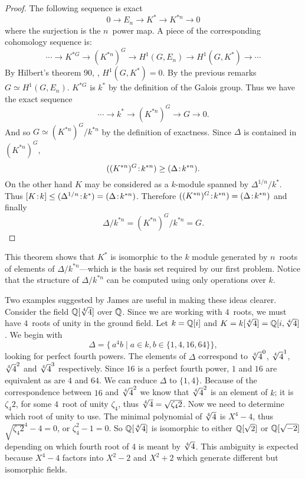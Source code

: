 \begin{proof}
The following sequence is exact
\[
0 \longrightarrow E_n \longrightarrow K^{\ast} \longrightarrow K^{\ast
n} \longrightarrow 0
\]
where the surjection is the $n$\th\ power map.  A piece of the corresponding
cohomology sequence is:
\[
 \cdots \longrightarrow K^{\ast G} \longrightarrow (K^{\ast n})^G
\longrightarrow H^1(G, E_n) \longrightarrow H^1(G, K^{\ast})
\longrightarrow \cdots
\]
By Hilbert's theorem 90, , $H^1(G,
K^{\ast}) = 0$. By the 
previous remarks $G \simeq H^1(G, E_n)$.  $K^{\ast G}$ is $k^{\ast}$ by
the definition of the Galois group.  Thus we have the exact sequence
\[
\cdots \longrightarrow k^{\ast} \longrightarrow (K^{\ast n})^G \longrightarrow G
\longrightarrow 0.
\]
And so $G \simeq (K^{\ast n})^{G}/k^{\ast n}$ by the definition of exactness.
Since $\Delta$ is contained in $(K^{\ast n})^G$,
\[
((K^{\ast n})^G\!:\!k^{\ast n}) \ge (\Delta\!:\!k^{\ast n}).
\]
On the other hand
$K$ may be considered as a $k$-module spanned by $\Delta^{1/n}/k^{\ast}$.
Thus $[K\!:\!k] \le (\Delta^{1/n}\!:\!k^{\ast})
 = (\Delta\!:\!k^{\ast n})$.
Therefore $((K^{\ast n})^G\!:\!k^{\ast n}) 
= (\Delta\!:\!k^{\ast n})$
and finally 
\[
\Delta/ k^{\ast n} = (K^{\ast n})^G / k^{\ast n} = G.
\]
\end{proof}

This theorem shows that $K^\ast$ is isomorphic to the $k$ module
generated by $n$\th\ roots of elements of $\Delta/k^{\ast n}$---which is
the basis set required by our first problem.  Notice that the structure of
$\Delta/k^{\ast n}$ can be computed using only operations over $k$.

Two examples suggested by James {\DavenportJ} are useful in making
these ideas clearer.  Consider the field $\Q[\root4\of{4}]$ over $\mathbb{Q}$.
Since we are working with $4$\th\ roots, we must have $4$\th\ roots of
unity in the ground field.  Let $k = \mathbb{Q}[i]$ and $K = k[\root4\of4] =
\Q[i, \root4\of4]$.  We begin with 
\[
\Delta = \{\,a^4 b \mid a \in k, b \in \{1, 4, 16, 64\}\},
\]
looking for perfect fourth powers.  The elements of $\Delta$ correspond
to ${\root4\of4}^0$, ${\root4\of4}^1$, ${\root4\of4}^2$ and
${\root4\of4}^3$ respectively.  Since $16$ is a perfect fourth power,
$1$ and $16$ are equivalent as are $4$ and $64$.  We can reduce $\Delta$
to $\{1, 4\}$.  Because of the correspondence between $16$ and 
${\root4\of4}^2$ we know that ${\root4\of4}^2$ is an element of $k$;
it is $\zeta_4 2$, for some $4$\th\ root of unity $\zeta_4$, thus
$\root4\of4 = \sqrt{\zeta_4 2}$.  Now we need to determine which
root of unity to use.  The minimal polynomial of $\root4\of4$ is
$X^4-4$,  thus $\sqrt{\zeta_4 2}^4 - 4 = 0$, or $\zeta_4^2-1 = 0$.  So
$\Q[\root4\of4]$ is isomorphic to either $\mathbb{Q}[\sqrt{2}]$ or
$\mathbb{Q}[\sqrt{-2}]$ depending on which fourth root of $4$ is meant by
$\root4\of4$.  This ambiguity is expected because $X^4-4$ factors into
$X^2-2$ and $X^2+2$ which generate different but isomorphic fields.

